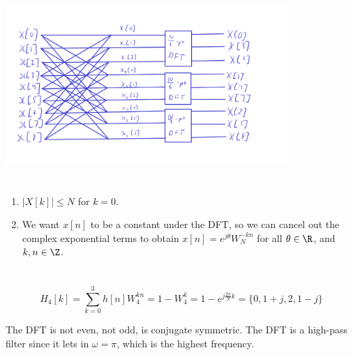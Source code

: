 \documentclass{article}
\begin{document}
\subsection{}

\begin{center}
    \includegraphics[width=0.8\textwidth]{q6d.png}
\end{center}

\newpage
\section{}

\begin{enumerate}
    \item \(|X[k]| \leqslant N\) for \(k = 0\).
    \item We want \(x[n]\) to be a constant under the DFT, so we can cancel out the complex exponential terms to obtain \(x[n] = e^{j \theta} W_N^{-kn}\) for all \(\theta \in \R\), and \(k, n \in \Z\).
\end{enumerate}

\newpage
\section{}

\subsection{}

\begin{equation}
    H_4[k] = \sum_{k = 0}^3 h[n] W_4^{kn} = 1 - W_4^k = 1 - e^{j \frac{2\pi}{N} k} = \{0, 1 + j, 2, 1 - j\}
\end{equation}
\begin{center}
\end{center}
The DFT is not even, not odd, is conjugate symmetric.
The DFT is a high-pass filter since it lets in \(\omega = \pi\), which is the highest frequency.

\subsection{}
\end{document}
